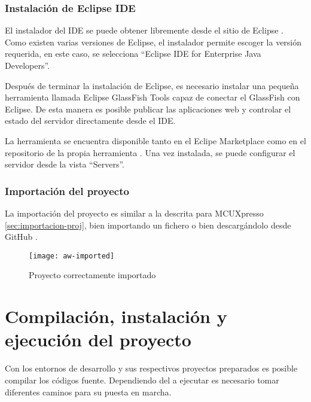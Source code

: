 \subsubsection{Instalación de Eclipse IDE} \label{sec:eclipse}
El instalador del IDE se puede obtener libremente desde el sitio de Eclipse
\cite{webpage:eclipse}. Como existen varias versiones de Eclipse, el instalador
permite escoger la versión requerida, en este caso, se selecciona ``Eclipse IDE
for Enterprise Java Developers''.


Después de terminar la instalación de Eclipse, es necesario instalar
una pequeña herramienta llamada Eclipse GlassFish Tools capaz de conectar el
GlassFish con Eclipse. De esta manera es posible publicar las aplicaciones web y
controlar el estado del servidor directamente desde el IDE.

La herramienta se encuentra disponible tanto en el Eclipe Marketplace como
en el repositorio de la propia herramienta \cite{webpage:glassfish-tools}. Una
vez instalada, se puede configurar el servidor desde la vista ``Servers''.


\subsubsection{Importación del proyecto} \label{sec:importacion-proj-ee}
La importación del proyecto es similar a la descrita para MCUXpresso
\ref{sec:importacion-proj}, bien importando un fichero o bien descargándolo
desde GitHub \cite{webpage:repo-aw}.

\begin{figure}[!h]
  \centering
  \texttt{[image: aw-imported]}
  \caption{Proyecto correctamente importado} \label{fig:aw-imported}
\end{figure}

\clearpage



\section{Compilación, instalación y ejecución del proyecto} \label{sec:exe}
Con los entornos de desarrollo y sus respectivos proyectos preparados es posible
compilar los códigos fuente. Dependiendo del  a ejecutar
es necesario tomar diferentes caminos para su puesta en marcha.


